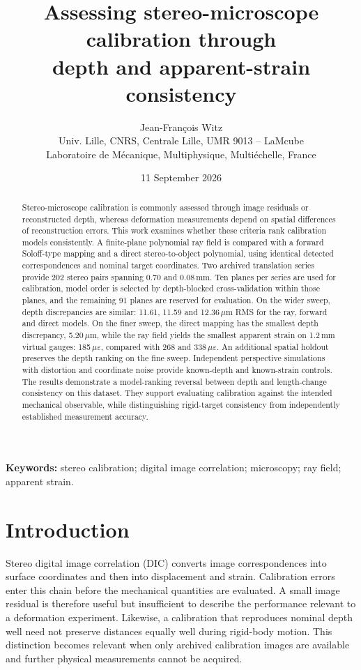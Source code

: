 \documentclass[10pt,a4paper]{article}
\title{Assessing stereo-microscope calibration through\protect\\ depth and apparent-strain consistency}
\author{Jean-Fran\c{c}ois Witz\\[3pt]
\small Univ. Lille, CNRS, Centrale Lille, UMR 9013 -- LaMcube\\
\small Laboratoire de M\'ecanique, Multiphysique, Multi\'echelle, France}
\date{11 September 2026}
\begin{document}
\maketitle
\begin{abstract}
Stereo-microscope calibration is commonly assessed through image residuals or reconstructed depth, whereas deformation measurements depend on spatial differences of reconstruction errors. This work examines whether these criteria rank calibration models consistently. A finite-plane polynomial ray field is compared with a forward Soloff-type mapping and a direct stereo-to-object polynomial, using identical detected correspondences and nominal target coordinates. Two archived translation series provide 202 stereo pairs spanning 0.70 and 0.08\,mm. Ten planes per series are used for calibration, model order is selected by depth-blocked cross-validation within those planes, and the remaining 91 planes are reserved for evaluation. On the wider sweep, depth discrepancies are similar: 11.61, 11.59 and 12.36\,$\mu$m RMS for the ray, forward and direct models. On the finer sweep, the direct mapping has the smallest depth discrepancy, 5.20\,$\mu$m, while the ray field yields the smallest apparent strain on 1.2\,mm virtual gauges: 185\,$\mu\varepsilon$, compared with 268 and 338\,$\mu\varepsilon$. An additional spatial holdout preserves the depth ranking on the fine sweep. Independent perspective simulations with distortion and coordinate noise provide known-depth and known-strain controls. The results demonstrate a model-ranking reversal between depth and length-change consistency on this dataset. They support evaluating calibration against the intended mechanical observable, while distinguishing rigid-target consistency from independently established measurement accuracy.
\end{abstract}
\noindent\textbf{Keywords:} stereo calibration; digital image correlation; microscopy; ray field; apparent strain.

\section{Introduction}
Stereo digital image correlation (DIC) converts image correspondences into surface coordinates and then into displacement and strain. Calibration errors enter this chain before the mechanical quantities are evaluated. A small image residual is therefore useful but insufficient to describe the performance relevant to a deformation experiment. Likewise, a calibration that reproduces nominal depth well need not preserve distances equally well during rigid-body motion. This distinction becomes relevant when only archived calibration images are available and further physical measurements cannot be acquired.
\end{document}
